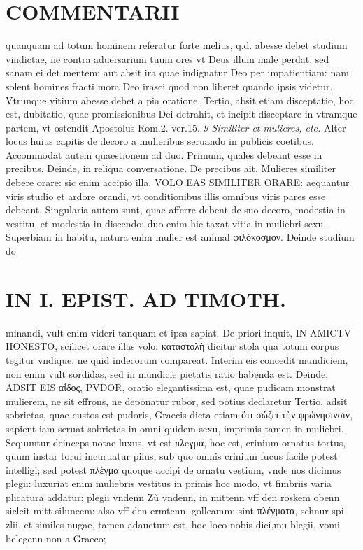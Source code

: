 \documentclass{article}
\begin{document}
\begin{pages}
\section*{COMMENTARII }
\marginpar{[ p.5 ]}\pstart quanquam ad totum hominem referatur forte melius, q.d. abesse debet studium vindictae, ne contra aduersarium tuum ores vt Deus illum male perdat, sed sanam ei det mentem: aut absit ira quae indignatur Deo per impatientiam: nam solent homines fracti mora Deo irasci quod non liberet quando ipsis videtur. Vtrunque vitium abesse debet a pia oratione. Tertio, absit etiam disceptatio, hoc est, dubitatio, quae promissionibus Dei detrahit, et incipit disceptare in vtramque partem, vt ostendit Apostolus Rom.2. ver.15.  \pend
\textit{9 Similiter et mulieres, etc. }\pstart Alter locus huius capitis de decoro a mulieribus seruando in publicis coetibus. Accommodat autem quaestionem ad duo. Primum, quales debeant esse in precibus. Deinde, in reliqua conversatione.  \pend\pstart De precibus ait, Mulieres similiter debere orare: sic enim accipio illa, VOLO EAS SIMILITER ORARE: aequantur viris studio et ardore orandi, vt conditionibus illis omnibus viris pares esse debeant. Singularia autem sunt, quae afferre debent de suo decoro, modestia in vestitu, et modestia in discendo: duo enim hic taxat vitia in muliebri sexu. Superbiam in habitu, natura enim mulier est animal φιλόκοσμον. Deinde studium do\pend
\section*{IN I. EPIST. AD TIMOTH. }
\marginpar{[ p.55 ]}\pstart minandi, vult enim videri tanquam et ipsa sapiat.  \pend\pstart De priori inquit, IN AMICTV HONESTO, scilicet orare illas volo: καταστολὴ dicitur stola qua totum corpus tegitur vndique, ne quid indecorum compareat. Interim eis concedit mundiciem, non enim vult sordidas, sed in mundicie pietatis ratio habenda est.  \pend\pstart Deinde, ADSIT EIS αἶδος, PVDOR, oratio elegantissima est, quae pudicam monstrat mulierem, ne sit effrons, ne deponatur rubor, sed potius declaretur  \pend\pstart Tertio, adsit sobrietas, quae custos est pudoris, Graecis dicta etiam ὅτι σώζει τὴν φρώνησινσιν, sapient iam seruat sobrietas in omni quidem sexu, imprimis tamen in muliebri.  \pend\pstart Sequuntur deinceps notae luxus, vt est πλeγμα, hoc est, crinium ornatus tortus, quum instar torui incuruatur pilus, sub quo omnis crinium fucus facile potest intelligi; sed potest πλέγμα quoque accipi de ornatu vestium, vnde nos dicimus plegii: luxuriat enim muliebris vestitus in primis hoc modo, vt fimbriis varia plicatura addatur: plegii vndenn Zũ vndenn, in mittenn vff den roskem obenn sicleit mitt siluneem: also vff den ermtenn, golleamm: sint πλέγματα, schnur spi zlii, et similes nugae, tamen adauctum est, hoc loco nobis dici,mu blegii, vomi belegenn non a Graeco;  \pend

\end{pages}
\end{document}
